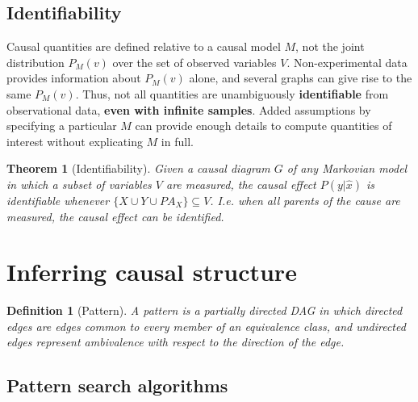 \documentclass[11pt]{article}
\numberwithin{equation}{section}
\newtheorem{thm}{Theorem}[section]
\newtheorem{defn}{Definition}[section]
\begin{document}
\subsection{Identifiability}
Causal quantities are defined relative to a causal model $M$, not the joint distribution $P_M(v)$ over the set of observed variables $V$. Non-experimental data provides information about $P_M(v)$ alone, and several graphs can give rise to the same $P_M(v)$. Thus, not all quantities are unambiguously \textbf{identifiable} from observational data, \textbf{even with infinite samples}. Added assumptions by specifying a particular $M$ can provide enough details to compute quantities of interest without explicating $M$ in full.

\begin{thm}[Identifiability]
Given a causal diagram $G$ of any Markovian model in which a subset of variables $V$ are measured, the causal effect $P(y|\hat{x})$ is identifiable whenever $\{X \cup Y \cup PA_X\} \subseteq V$. I.e. \textit{when all parents of the cause are measured, the causal effect can be identified}.
\end{thm}



\section{Inferring causal structure}

\begin{defn}[Pattern]
A pattern is a partially directed DAG in which directed edges are edges common to every member of an equivalence class, and undirected edges represent ambivalence with respect to the direction of the edge. 
\end{defn}

\subsection{Pattern search algorithms}
\end{document}
